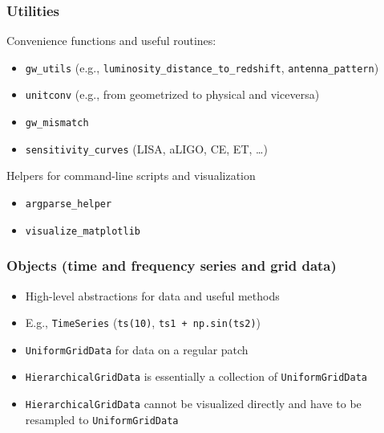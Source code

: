 \documentclass[compress, aspectratio=169]{beamer}
\begin{document}
\begin{frame}
  \frametitle{Utilities}

  Convenience functions and useful routines:
  \begin{itemize}
    \item \texttt{gw\_utils} (e.g., \texttt{luminosity\_distance\_to\_redshift},
    \texttt{antenna\_pattern})
    \item \texttt{unitconv} (e.g., from geometrized to physical and viceversa)
    \item \texttt{gw\_mismatch}
    \item \texttt{sensitivity\_curves} (LISA, aLIGO, CE, ET, \dots)
  \end{itemize}

  Helpers for command-line scripts and visualization
  \begin{itemize}
    \item \texttt{argparse\_helper}
    \item \texttt{visualize\_matplotlib}
  \end{itemize}

\end{frame}

\begin{frame}
  \frametitle{Objects (time and frequency series and grid data)}
  \begin{itemize}
    \item High-level abstractions for data and useful methods
    \item E.g., \texttt{TimeSeries} (\texttt{ts(10)}, \texttt{ts1 + np.sin(ts2)})
    \pause
    \item \texttt{UniformGridData} for data on a regular patch
    \item \texttt{HierarchicalGridData} is essentially a collection of
    \texttt{UniformGridData}
    \item \texttt{HierarchicalGridData} cannot be visualized directly and have to be resampled to \texttt{UniformGridData}
  \end{itemize}
\end{frame}
\end{document}

